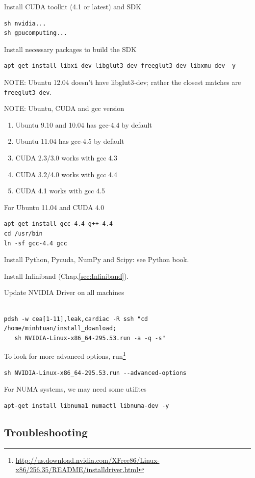 Install CUDA toolkit (4.1 or latest) and SDK
\begin{verbatim}
sh nvidia...
sh gpucomputing...
\end{verbatim}

Install necessary packages to build the SDK
\begin{verbatim}
apt-get install libxi-dev libglut3-dev freeglut3-dev libxmu-dev -y
\end{verbatim}
NOTE: Ubuntu 12.04 doesn't have libglut3-dev; rather the closest matches are
\verb!freeglut3-dev!.

NOTE: Ubuntu, CUDA and gcc version
\begin{enumerate}
  \item Ubuntu 9.10 and 10.04 has gcc-4.4 by default
  \item Ubuntu 11.04 has gcc-4.5 by default
  \item CUDA 2.3/3.0 works with gcc 4.3 
  \item CUDA 3.2/4.0 works with gcc 4.4
  \item CUDA 4.1 works with gcc 4.5
\end{enumerate}
For Ubuntu 11.04 and CUDA 4.0
\begin{verbatim}
apt-get install gcc-4.4 g++-4.4
cd /usr/bin
ln -sf gcc-4.4 gcc
\end{verbatim}

Install Python, Pycuda, NumPy and Scipy: see Python book.

Install Infiniband (Chap.\ref{sec:Infiniband}).


Update NVIDIA Driver on all machines
\begin{verbatim}

pdsh -w cea[1-11],leak,cardiac -R ssh "cd /home/minhtuan/install_download;
   sh NVIDIA-Linux-x86_64-295.53.run -a -q -s"
\end{verbatim}

To look for more advanced options,
run\footnote{\url{http://us.download.nvidia.com/XFree86/Linux-x86/256.35/README/installdriver.html}}
\begin{verbatim}
sh NVIDIA-Linux-x86_64-295.53.run --advanced-options
\end{verbatim}

For NUMA systems, we may need some utilites
\begin{verbatim}
apt-get install libnuma1 numactl libnuma-dev -y 
\end{verbatim}

\subsection{Troubleshooting}

